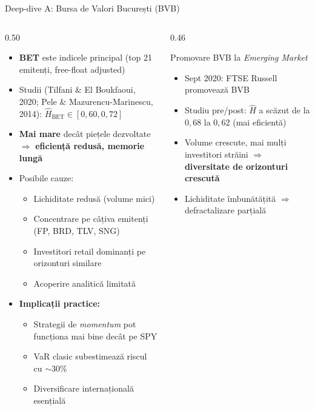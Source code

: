\documentclass[9pt, aspectratio=169, t]{beamer}
\theoremstyle{definition}
\newenvironment{cminipage}[1]{%
    \par\noindent\hfill\begin{minipage}{#1}\ignorespaces
}{%
    \end{minipage}\hfill\null\par
}
\begin{document}
\begin{frame}[shrink=15]{Deep-dive A: Bursa de Valori București (BVB)}
\begin{cminipage}{0.95\textwidth}
\begin{columns}[T]
\begin{column}{0.50\textwidth}
\begin{itemize}\setlength{\itemsep}{0pt}
    \item \textbf{BET} este indicele principal (top 21 emitenți, free-float adjusted)
    \item Studii (Tilfani \& El Boukfaoui, 2020; Pele \& Mazurencu-Marinescu, 2014): $\hat{H}_{\text{BET}} \in [0{,}60, 0{,}72]$
    \item \textbf{Mai mare} decât piețele dezvoltate $\Rightarrow$ \textbf{eficiență redusă, memorie lungă}
    \item Posibile cauze:
    \begin{itemize}\setlength{\itemsep}{0pt}
        \item Lichiditate redusă (volume mici)
        \item Concentrare pe câțiva emitenți (FP, BRD, TLV, SNG)
        \item Investitori retail dominanți pe orizonturi similare
        \item Acoperire analitică limitată
    \end{itemize}
    \item \textbf{Implicații practice:}
    \begin{itemize}\setlength{\itemsep}{0pt}
        \item Strategii de \textit{momentum} pot funcționa mai bine decât pe SPY
        \item VaR clasic subestimează riscul cu $\sim 30\%$
        \item Diversificare internațională esențială
    \end{itemize}
\end{itemize}
\end{column}
\begin{column}{0.46\textwidth}
\begin{block}{Promovare BVB la \textit{Emerging Market}}
\begin{itemize}\setlength{\itemsep}{0pt}
    \item Sept 2020: FTSE Russell promovează BVB
    \item Studiu pre/post: $\hat{H}$ a scăzut de la $0{,}68$ la $0{,}62$ (mai eficientă)
    \item Volume crescute, mai mulți investitori străini $\Rightarrow$ \textbf{diversitate de orizonturi crescută}
    \item Lichiditate îmbunătățită $\Rightarrow$ defractalizare parțială
\end{itemize}
\end{block}


\end{column}
\end{columns}
\end{cminipage}
\end{frame}
\end{document}
